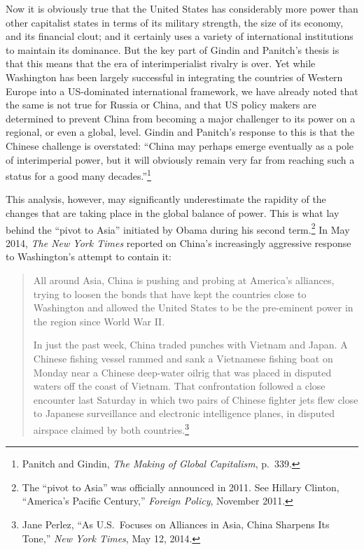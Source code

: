 Now it is obviously true that the United States has considerably more power than other capitalist states in terms of its military strength, the size of its economy, and its financial clout; and it certainly uses a variety of international institutions to maintain its dominance. But the key part of Gindin and Panitch's thesis is that this means that the era of interimperialist rivalry is over. Yet while Washington has been largely successful in integrating the countries of Western Europe into a US-dominated international framework, we have already noted that the same is not true for Russia or China, and that US policy makers are determined to prevent China from becoming a major challenger to its power on a regional, or even a global, level. Gindin and Panitch's response to this is that the Chinese challenge is overstated: ``China may perhaps emerge eventually as a pole of interimperial power, but it will obviously remain very far from reaching such a status for a good many decades.''\footnote{Panitch and Gindin, \emph{The Making of Global Capitalism}, p.\ 339.}

This analysis, however, may significantly underestimate the rapidity of the changes that are taking place in the global balance of power. This is what lay behind the ``pivot to Asia'' initiated by Obama during his second term.\footnote{The ``pivot to Asia'' was officially announced in 2011. See Hillary Clinton, ``America's Pacific Century,'' \emph{Foreign Policy}, November 2011.} In May 2014, \emph{The New York Times} reported on China's increasingly aggressive response to Washington's attempt to contain it:

\blockquote{All around Asia, China is pushing and probing at America's alliances, trying to loosen the bonds that have kept the countries close to Washington and allowed the United States to be the pre-eminent power in the region since World War II.

In just the past week, China traded punches with Vietnam and Japan. A Chinese fishing vessel rammed and sank a Vietnamese fishing boat on Monday near a Chinese deep-water oilrig that was placed in disputed waters off the coast of Vietnam. That confrontation followed a close encounter last Saturday in which two pairs of Chinese fighter jets flew close to Japanese surveillance and electronic intelligence planes, in disputed airspace claimed by both countries.\footnote{Jane Perlez, ``As U.S.\ Focuses on Alliances in Asia, China Sharpens Its Tone,'' \emph{New York Times}, May 12, 2014.}}

